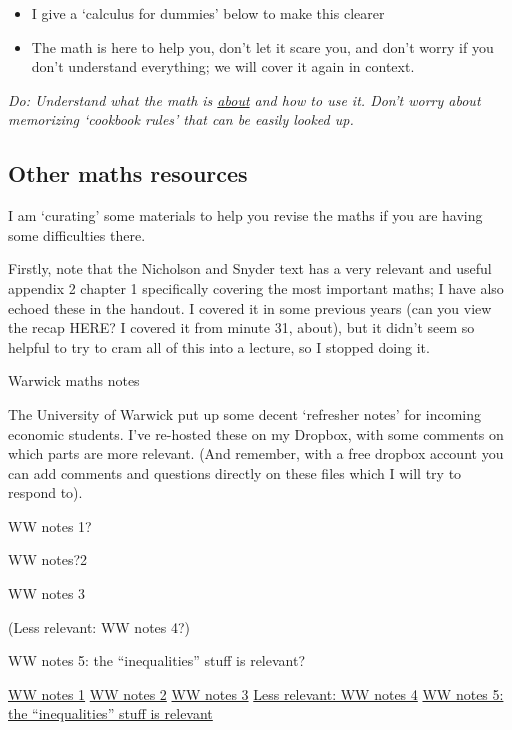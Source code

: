 \documentclass[]{article}
\begin{document}
\begin{itemize}
\item
  I give a `calculus for dummies' below to make this clearer
\item
  The math is here to help you, don't let it scare you, and don't worry
  if you don't understand everything; we will cover it again in context.
\end{itemize}

\emph{Do: Understand what the math is \underline{about} and how to use
it. Don't worry about memorizing `cookbook rules' that can be easily
looked up.}

\bigskip

\hypertarget{other-maths-resources}{%
\subsection{Other maths resources}\label{other-maths-resources}}

I am `curating' some materials to help you revise the maths if you are
having some difficulties there.

Firstly, note that the Nicholson and Snyder text has a very relevant and
useful appendix 2 chapter 1 specifically covering the most important
maths; I have also echoed these in the handout. I covered it in some
previous years (can you view the recap HERE? I covered it from minute
31, about), but it didn't seem so helpful to try to cram all of this
into a lecture, so I stopped doing it.

\bigskip

Warwick maths notes

The University of Warwick put up some decent `refresher notes' for
incoming economic students. I've re-hosted these on my Dropbox, with
some comments on which parts are more relevant. (And remember, with a
free dropbox account you can add comments and questions directly on
these files which I will try to respond to).

WW notes 1?

WW notes?2

WW notes 3

(Less relevant: WW notes 4?)

WW notes 5: the ``inequalities'' stuff is relevant?

\href{https://www.dropbox.com/s/99ugisobfvuc15e/Warwick_maths-revision-notes-1_drcomments.pdf?dl=0\%22\%3EWW\%20notes\%201}{WW
notes 1}
\href{href=\%22https://www.dropbox.com/s/93xw3hwv9oqlymn/WW_maths-revision-notes-2_drcomments.pdf?dl=0\%22\%3EWW\%20notes?2}{WW
notes 2}
\href{https://www.dropbox.com/s/93xw3hwv9oqlymn/WW_maths-revision-notes-2_drcomments.pdf?dl=0}{WW
notes 3}
\href{https://www.dropbox.com/s/0ppmpw5t5anfpd8/WW_maths-revision-notes-4_Drcomments_slightlylessrelevant.pdf?dl=0}{Less
relevant: WW notes 4}
\href{https://www.dropbox.com/s/0ppmpw5t5anfpd8/WW_maths-revision-notes-4_Drcomments_slightlylessrelevant.pdf?dl=0}{WW
notes 5: the ``inequalities'' stuff is relevant}
\end{document}
